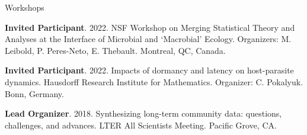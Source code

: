 \documentclass{resume} %
\begin{document}
\bigskip


\begin{rSection}{Workshops}

{\bf Invited Participant}. 2022. NSF Workshop on Merging Statistical Theory and Analyses at the Interface of Microbial and ‘Macrobial’ Ecology. Organizers: M. Leibold, P. Peres-Neto, E. Thebault. Montreal, QC, Canada.

{\bf Invited Participant}. 2022. Impacts of dormancy and latency on host-parasite dynamics. Hausdorff Research Institute for Mathematics. Organizer: C. Pokalyuk. Bonn, Germany.

{\bf Lead Organizer}. 2018. Synthesizing long-term community data: questions, challenges, and advances. LTER All Scientists Meeting. Pacific Grove, CA.

\end{rSection}
\bigskip
\newpage
\end{document}
